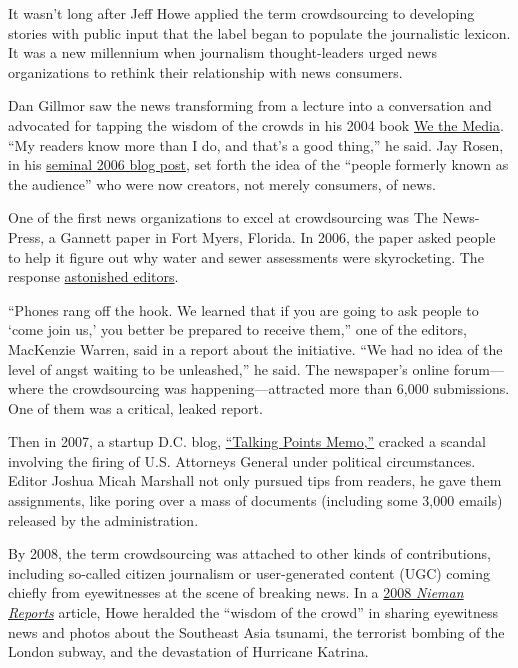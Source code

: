 \documentclass[notoc, symmetric, nobib, nols]{towcenter-guideto-book}
\begin{document}
It wasn't long after Jeff Howe applied the term crowdsourcing to developing stories with public input that the label began to populate the journalistic lexicon.\autocite{Howe} It was a new millennium when journalism thought-leaders urged news organizations to rethink their relationship with news consumers. 

Dan Gillmor saw the news transforming from a lecture into a conversation and advocated for tapping the wisdom of the crowds in his 2004 book \href{http://www.oreilly.com/wethemedia/}{We the Media}.\autocite{Gillmor} ``My readers know more than I do, and that's a good thing,'' he said. Jay Rosen, in his \href{http://archive.pressthink.org/2006/06/27/ppl_frmr.html}{seminal 2006 blog post}, set forth the idea of the ``people formerly known as the audience'' who were now creators, not merely consumers, of news.\autocite{Rosen} 

One of the first news organizations to excel at crowdsourcing was The News-Press, a Gannett paper in Fort Myers, Florida. In 2006, the paper asked people to help it figure out why water and sewer assessments were skyrocketing. The response \href{http://www.crowdsourcing.com/cs/2006/11/the_new_investi.html}{astonished editors}. \autocite{FortMyers}

“Phones rang off the hook. We learned that if you are going to ask people to ‘come join us,' you better be prepared to receive them,” one of the editors, MacKenzie Warren, said in a report about the initiative. \autocite{FortMyers} “We had no idea of the level of angst waiting to be unleashed,” he said. The newspaper's online forum---where the crowdsourcing was happening---attracted more than 6,000 submissions. One of them was a critical, leaked report. 

Then in 2007, a startup D.C. blog, \href{http://www.nytimes.com/2008/02/25/business/media/25marshall.html?_r=3\&oref=slogin\&ref=todayspaper\&pagewanted=print\&}{``Talking Points Memo,''} cracked a scandal involving the firing of U.S. Attorneys General under political circumstances. Editor Joshua Micah Marshall not only pursued tips from readers, he gave them assignments, like poring over a mass of documents (including some 3,000 emails) released by the administration.\autocite{talkingpoints} 

By 2008, the term crowdsourcing was attached to other kinds of contributions, including so-called citizen journalism or user-generated content (UGC) coming chiefly from eyewitnesses at the scene of breaking news. In a \href{http://niemanreports.org/articles/the-wisdom-of-the-crowd-resides-in-how-the-crowd-is-used/}{2008 \textit{Nieman Reports}} article, Howe heralded the ``wisdom of the crowd'' in sharing eyewitness news and photos about the Southeast Asia tsunami, the terrorist bombing of the London subway, and the devastation of Hurricane Katrina.\autocite{Nieman}
\end{document}
